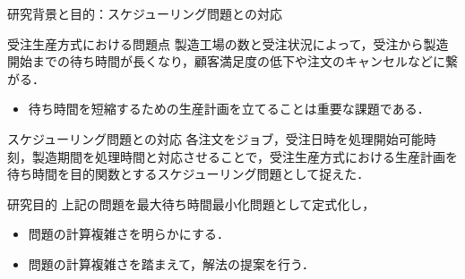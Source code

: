\documentclass[dvipdfmx]{beamer}
\begin{document}
    \begin{frame}{研究背景と目的：スケジューリング問題との対応}
      \begin{block}{受注生産方式における問題点}
        製造工場の数と受注状況によって，受注から製造開始までの\alert{待ち時間}が長くなり，顧客満足度の低下や注文のキャンセルなどに繋がる．
      \end{block}
      \begin{itemize}
        \setlength{\leftskip}{-5mm}
        \item 待ち時間を短縮するための生産計画を立てることは重要な課題である．
      \end{itemize}

      \begin{block}{スケジューリング問題との対応}
        各注文を\alert{ジョブ}，受注日時を\alert{処理開始可能時刻}，製造期間を\alert{処理時間}と対応させることで，受注生産方式における生産計画を\alert{待ち時間}を目的関数とするスケジューリング問題として捉えた．
      \end{block}

      \begin{block}{研究目的}
        上記の問題を\alert{最大待ち時間最小化問題}として定式化し，
        \begin{itemize}
          \setlength{\leftskip}{-2mm}
          \item 問題の計算複雑さを明らかにする．
          \item 問題の計算複雑さを踏まえて，解法の提案を行う．
        \end{itemize}
      \end{block}

    \end{frame}
\end{document}

